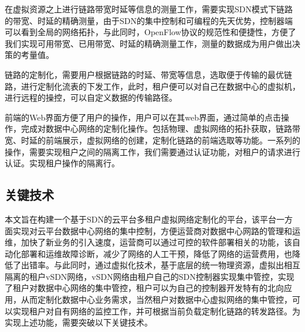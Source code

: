 在虚拟资源之上进行链路带宽时延等信息的测量工作，需要实现SDN模式下链路的带宽、时延的精确测量，由于SDN的集中控制和可编程的先天优势，控制器端可以看到全局的网络拓扑，与此同时，OpenFlow协议的规范性和便捷性，方便了我们实现可用带宽、已用带宽、时延的精确测量工作，测量的数据成为用户做出决策的考量值。

链路的定制化，需要用户根据链路的时延、带宽等信息，选取便于传输的最优链路，进行定制化流表的下发工作，此时，租户便可以对自己在数据中心的虚拟机，进行远程的操控，可以自定义数据的传输路径。

前端的Web界面方便了用户的操作，用户可以在其web界面，通过简单的点击操作，完成对数据中心网络的定制化操作。包括物理、虚拟网络的拓扑获取，链路带宽、时延的前端展示，虚拟网络的创建，定制化链路的前端选取等功能。一系列的操作，需要实现租户之间的隔离工作，我们需要通过认证功能，对租户的请求进行认证。实现租户操作的隔离行。

\subsection{关键技术}
本文旨在构建一个基于SDN的云平台多租户虚拟网络定制化的平台，该平台一方面实现对云平台数据中心网络的集中控制，方便运营商对数据中心网路的管理和运维，加快了新业务的引入速度，运营商可以通过可控的软件部署相关的功能，该自动化部署和运维故障诊断，减少了网络的人工干预，降低了网络的运营费用，也降低了出错率。与此同时，通过虚拟化技术，基于底层的统一物理资源，虚拟出相互隔离的租户vSDN网络，vSDN网络由租户自己的SDN控制器实现集中管控，实现了租户对数据中心网络的集中管控，租户可以为自己的控制器开发特有的北向应用，从而定制化数据中心业务需求，当然租户对数据中心虚拟网络的集中管控，可以实现租户对自有网络的监控工作，并可根据当前负载定制化链路的转发路径。为实现上述功能，需要突破以下关键技术。

